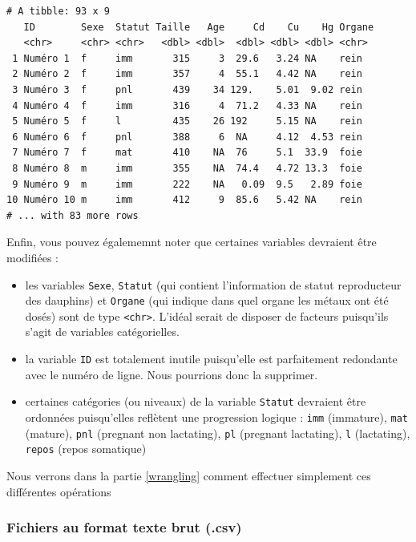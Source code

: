 \documentclass[a4paperpaper,]{article}
\providecommand{\tightlist}{%
  \setlength{\itemsep}{0pt}\setlength{\parskip}{0pt}}
\theoremstyle{definition}
\theoremstyle{definition}
\theoremstyle{definition}
\theoremstyle{remark}
\begin{document}
\begin{verbatim}
# A tibble: 93 x 9
   ID        Sexe  Statut Taille   Age     Cd    Cu    Hg Organe
   <chr>     <chr> <chr>   <dbl> <dbl>  <dbl> <dbl> <dbl> <chr> 
 1 Numéro 1  f     imm       315     3  29.6   3.24 NA    rein  
 2 Numéro 2  f     imm       357     4  55.1   4.42 NA    rein  
 3 Numéro 3  f     pnl       439    34 129.    5.01  9.02 rein  
 4 Numéro 4  f     imm       316     4  71.2   4.33 NA    rein  
 5 Numéro 5  f     l         435    26 192     5.15 NA    rein  
 6 Numéro 6  f     pnl       388     6  NA     4.12  4.53 rein  
 7 Numéro 7  f     mat       410    NA  76     5.1  33.9  foie  
 8 Numéro 8  m     imm       355    NA  74.4   4.72 13.3  foie  
 9 Numéro 9  m     imm       222    NA   0.09  9.5   2.89 foie  
10 Numéro 10 m     imm       412     9  85.6   5.42 NA    rein  
# ... with 83 more rows
\end{verbatim}

Enfin, vous pouvez égalememnt noter que certaines variables devraient
être modifiées :

\begin{itemize}
\tightlist
\item
  les variables \texttt{Sexe}, \texttt{Statut} (qui contient
  l'information de statut reproducteur des dauphins) et \texttt{Organe}
  (qui indique dans quel organe les métaux ont été dosés) sont de type
  \texttt{\textless{}chr\textgreater{}}. L'idéal serait de disposer de
  facteurs puisqu'ils s'agit de variables catégorielles.
\item
  la variable \texttt{ID} est totalement inutile puisqu'elle est
  parfaitement redondante avec le numéro de ligne. Nous pourrions donc
  la supprimer.
\item
  certaines catégories (ou niveaux) de la variable \texttt{Statut}
  devraient être ordonnées puisqu'elles reflètent une progression
  logique : \texttt{imm} (immature), \texttt{mat} (mature), \texttt{pnl}
  (pregnant non lactating), \texttt{pl} (pregnant lactating), \texttt{l}
  (lactating), \texttt{repos} (repos somatique)
\end{itemize}

Nous verrons dans la partie \ref{wrangling} comment effectuer simplement
ces différentes opérations

\hypertarget{plaintext}{%
\subsubsection{Fichiers au format texte brut (.csv)}\label{plaintext}}
\end{document}
